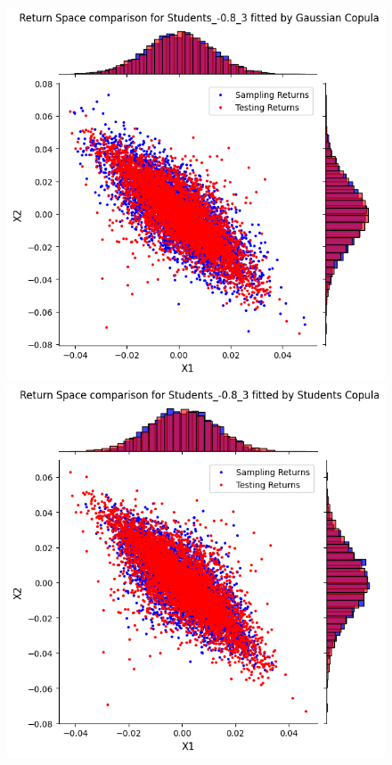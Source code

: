 \documentclass[%
a4paper,							
11pt,								
bibliography=totoc,						
abstracton=true					
]
{scrartcl}
\theoremstyle{plain}
\theoremstyle{definition}
\theoremstyle{remark}
\newcommand{\1}{\mathbbm{1}}
\begin{document}
\begin{figure}[H]
    \centering
    \begin{minipage}{0.49\textwidth}
        \centering
        \includegraphics[width=\textwidth]{5ResultsDiscussion/pictures/PortfolioTest/Port3Gauss.png}
    \end{minipage}
    \hfill
    \begin{minipage}{0.49\textwidth}
        \centering
        \includegraphics[width=\textwidth]{5ResultsDiscussion/pictures/PortfolioTest/Port3Students.png}

\end{minipage}
\end{figure}
\end{document}
